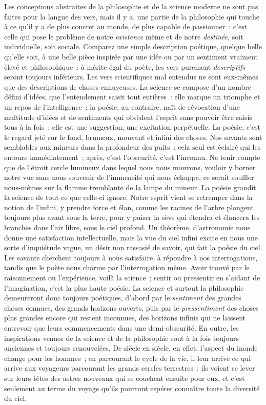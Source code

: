 \documentclass[french,twoside]{book} %
\begin{document}
Les conceptions abstraites de la philosophie et de la science moderne ne sont pas faites pour la langue des vers, mais il y a, une partie de la philosophie qui touche à ce qu’il y a de plus concret au monde, de plus capable de passionner : c’est celle qui pose le problème de notre \emph{existence} même et de notre \emph{destinée}, soit individuelle, soit sociale. Comparez une simple description poétique, quelque belle qu’elle soit, à une belle pièce inspirée par une idée ou par un sentiment vraiment élevé et philosophique : à mérite égal du poète, les vers purement \emph{descriptifs} seront toujours inférieurs. Les vers scientifiques mal entendus ne sont eux-mêmes que des descriptions de choses ennuyeuses. La science se compose d’un nombre défini d’idées, que l’entendement saisit tout entières : elle marque un triomphe et un repos de l’intelligence ; la poésie, au contraire, naît de révocation d’une multitude d’idées et de sentiments qui obsèdent l’esprit sans pouvoir être saisis tous à la fois : elle est une suggestion, une excitation perpétuelle. La poésie, c’est le regard jeté sur le fond, brumeux, mouvant et infini des choses. Nos savants sont semblables aux mineurs dans la profondeur des puits : cela seul est éclairé qui les entoure immédiatement ; après, c’est l’obscurité, c’est l’inconnu. Ne tenir compte que de l’étroit cercle lumineux dans lequel nous nous mouvons, vouloir y borner notre vue sans nous souvenir de l’immensité qui nous échappe, ce serait souffler nous-mêmes sur la flamme tremblante de la lampe du mineur. La poésie grandit la science de tout ce que celle-ci ignore. Notre esprit vient se retremper dans la notion de l’infini, y prendre force et élan, comme les racines de l’arbre plongent toujours plus avant sous la terre, pour y puiser la sève qui étendra et élancera les branches dans l’air libre, sous le ciel profond. Un théorème, d’astronomie nous donne une satisfaction intellectuelle, mais la vue du ciel infini excite en nous une sorte d’inquiétude vague, un désir non rassasié de savoir, qui fait la poésie du ciel. Les savants cherchent toujours à nous satisfaire, à répondre à nos interrogations, tandis que le poète nous charme par l’interrogation même. Avoir trouvé par le raisonnement ou l’expérience, voilà la science ; sentir ou pressentir en s’aidant de l’imagination, c’est la plus haute poésie. La science et surtout la philosophie demeureront donc toujours poétiques, d’abord par le \emph{sentiment} des grandes choses connues, des grands horizons ouverts, puis par le \emph{pressentiment} des choses plus grandes encore qui restent inconnues, des horizons infinis qui ne laissent entrevoir que leurs commencements dans une demi-obscurité. En outre, les inspirations venues de la science et de la philosophie sont à la fois toujours anciennes et toujours renouvelées. De siècle en siècle, en effet, l’aspect du inonde change pour les hommes ; en parcourant le cycle de la vie, il leur arrive ce qui arrive aux voyageurs parcourant les grands cercles terrestres : ils voient se lever sur leurs têtes des astres nouveaux qui se couchent ensuite pour eux, et c’est seulement au terme du voyage qu’ils pourront espérer connaître toute la diversité du ciel.\par
\end{document}

